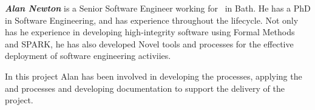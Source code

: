 \label{AlanNewton}
\textbf{\emph{Alan Newton}} is a Senior Software Engineer working for \altran\ in Bath. He has a PhD in Software Engineering, and has experience throughout the lifecycle. Not only has he experience in developing high-integrity software using Formal Methods and SPARK, he has also developed Novel tools and processes for the effective deployment of software engineering activiies.

In this project Alan has been involved in developing the processes, applying the \reveal and \informed processes and developing documentation to support the delivery of the project.

